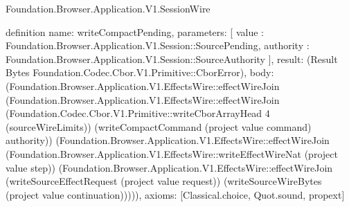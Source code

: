 \begin{lexlean}{Foundation.Browser.Application.V1.SessionWire}
\begin{semanticmodule}
definition{
  name: writeCompactPending,
  parameters: [
    value : Foundation.Browser.Application.V1.Session::SourcePending,
    authority : Foundation.Browser.Application.V1.Session::SourceAuthority
  ],
  result: (Result Bytes Foundation.Codec.Cbor.V1.Primitive::CborError),
  body: (Foundation.Browser.Application.V1.EffectsWire::effectWireJoin (Foundation.Browser.Application.V1.EffectsWire::effectWireJoin (Foundation.Codec.Cbor.V1.Primitive::writeCborArrayHead 4 (sourceWireLimits)) (writeCompactCommand (project value command) authority)) (Foundation.Browser.Application.V1.EffectsWire::effectWireJoin (Foundation.Browser.Application.V1.EffectsWire::writeEffectWireNat (project value step)) (Foundation.Browser.Application.V1.EffectsWire::effectWireJoin (writeSourceEffectRequest (project value request)) (writeSourceWireBytes (project value continuation))))),
  axioms: [Classical.choice, Quot.sound, propext]
}


\end{semanticmodule}
\end{lexlean}
